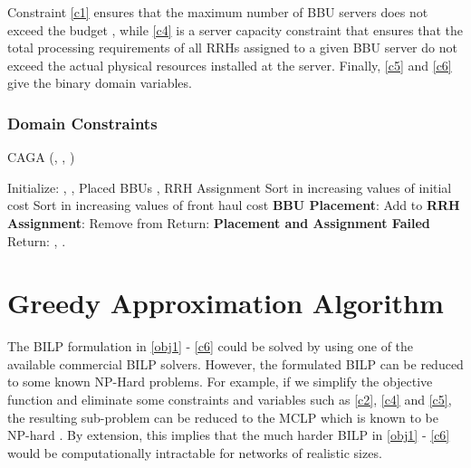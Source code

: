 \documentclass[conference]{IEEEtran}
\begin{document}
Constraint \eqref{c1} ensures that the maximum number of \ac{BBU} servers does not exceed the budget , while \eqref{c4} is a server capacity constraint that ensures that the total processing requirements of all \acp{RRH} assigned to a given \ac{BBU} server do not exceed the actual physical resources installed at the server. Finally, \eqref{c5} and \eqref{c6} give the binary domain variables.

\subsubsection{Domain Constraints}





\begin{algorithm}[t]
\caption{CAGA \Big(, , \Big)}
\label{caga}
\renewcommand{\arraystretch}{3.5}
\begin{algorithmic}[1]
\STATE Initialize: , , Placed \acp{BBU} , \ac{RRH} Assignment 
\STATE Sort  in increasing values of initial cost 
\IF {  }
\STATE Sort  in increasing values of front haul cost 
\IF{}
\STATE  \textbf{BBU Placement}: Add  to 
\STATE 
\ENDIF
\STATE \textbf{RRH Assignment}: 
\STATE 
\STATE Remove  from 
\ENDIF
\ENDFOR
\ENDIF
\ENDFOR
\IF{}
\STATE Return: \textbf{Placement and Assignment Failed}
\ELSE
\STATE Return: , .
\ENDIF
\end{algorithmic}
\end{algorithm}

\section{Greedy Approximation Algorithm}\label{greedy}

The \ac{BILP} formulation in \eqref{obj1} - \eqref{c6} could be solved by using one of the available commercial BILP solvers. However, the formulated BILP can be reduced to some known NP-Hard problems. For example, if we simplify the objective function and eliminate some constraints and variables such as \eqref{c2}, \eqref{c4} and \eqref{c5}, the resulting sub-problem can be reduced to the \ac{MCLP} which is known to be NP-hard \cite{MCLP74}. By extension, this implies that the much harder \ac{BILP} in \eqref{obj1} - \eqref{c6} would be computationally intractable for networks of realistic sizes.
\end{document}
